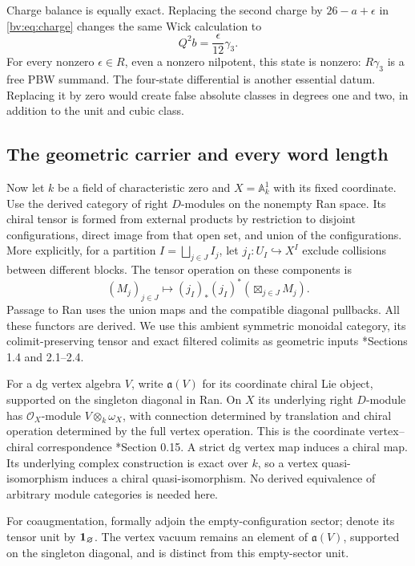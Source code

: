 Charge balance is equally exact.  Replacing the second charge by
\(26-a+\epsilon\) in \eqref{bv:eq:charge} changes the same Wick
calculation to
\[
 Q^2b=\frac\epsilon{12}\gamma_3.
\]
For every nonzero \(\epsilon\in R\), even a nonzero nilpotent,
this state is nonzero: \(R\gamma_3\) is a free PBW summand.
The four-state differential is another essential datum.  Replacing
it by zero would create false absolute classes in degrees one and
two, in addition to the unit and cubic class.

\subsection{The geometric carrier and every word length}

Now let \(k\) be a field of characteristic zero and
\(X=\mathbb A^1_k\) with its fixed coordinate.  Use the derived
category of right \(D\)-modules on the nonempty Ran space.  Its chiral
tensor is formed from external products by restriction to disjoint
configurations, direct image from that open set, and union of the
configurations.  More explicitly, for a partition
\(I=\bigsqcup_{j\in J}I_j\), let
\(j_I:U_I\hookrightarrow X^I\) exclude collisions between different
blocks.  The tensor operation on these components is
\[
 (M_j)_{j\in J}\longmapsto
 (j_I)_*(j_I)^*\left(\boxtimes_{j\in J}M_j\right).
\]
Passage to Ran uses the union maps and the compatible diagonal
pullbacks.  All these functors are derived.  We use this ambient
symmetric monoidal category, its colimit-preserving tensor and exact
filtered colimits as geometric inputs
\cite{FG12}*{Sections 1.4 and 2.1--2.4}.

For a dg vertex algebra \(V\), write \(\mathfrak a(V)\) for its
coordinate chiral Lie object, supported on the singleton diagonal in
Ran.  On \(X\) its underlying right \(D\)-module has
\(\mathcal O_X\)-module \(V\otimes_k\omega_X\), with connection
determined by translation and chiral operation determined by the full
vertex operation.  This is the coordinate vertex--chiral
correspondence \cite{BD04}*{Section 0.15}.  A strict dg vertex map
induces a chiral map.  Its underlying complex construction is exact
over \(k\), so a vertex quasi-isomorphism induces a chiral
quasi-isomorphism.  No derived equivalence of arbitrary module
categories is needed here.

For coaugmentation, formally adjoin the empty-configuration sector;
denote its tensor unit by \(\mathbf{1}_{\varnothing}\).  The vertex vacuum
remains an element of \(\mathfrak a(V)\), supported on the singleton
diagonal, and is distinct from this empty-sector unit.

